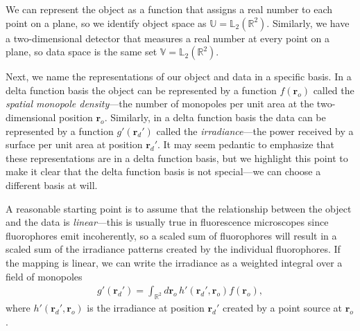 \documentclass[]{osa-article}
\providecommand{\ro}{\mathbf{\mathbf{r}}_o}
\providecommand{\rd}{\mathbf{r}_d}
\providecommand{\mbb}[1]{\mathbb{#1}}
\begin{document}
We can represent the object as a function that assigns a real number to each
point on a plane, so we identify object space as
$\mbb{U} = \mbb{L}_2(\mbb{R}^2)$. Similarly, we have a two-dimensional detector
that measures a real number at every point on a plane, so data space is the same
set $\mbb{V} = \mbb{L}_2(\mbb{R}^2)$.

Next, we name the representations of our object and data in a specific basis. In
a delta function basis the object can be represented by a function $f(\ro)$
called the \textit{spatial monopole density}---the number of monopoles per unit
area at the two-dimensional position $\ro$. Similarly, in a delta function basis
the data can be represented by a function $g'(\rd')$ called the
\textit{irradiance}---the power received by a surface per unit area at position
$\rd'$. It may seem pedantic to emphasize that these representations are in a
delta function basis, but we highlight this point to make it clear that the
delta function basis is not special---we can choose a different basis at will.

A reasonable starting point is to assume that the relationship between the
object and the data is \textit{linear}---this is usually true in fluorescence
microscopes since fluorophores emit incoherently, so a scaled sum of
fluorophores will result in a scaled sum of the irradiance patterns created by
the individual fluorophores. If the mapping is linear, we can write the
irradiance as a weighted integral over a field of monopoles
\begin{align}
g'(\rd') = \int_{\mbb{R}^2}d\ro\, h'(\rd',\ro)f(\ro), \label{eq:fwdmono}
\end{align}
where $h'(\rd{}', \ro{})$ is the irradiance at position $\rd'$ created by a
point source at $\ro$.
\end{document}
